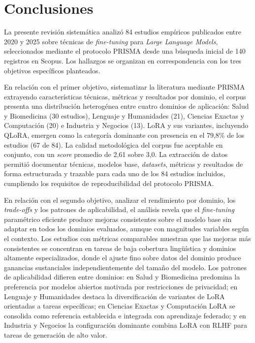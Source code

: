\chapter{Conclusiones}

La presente revisión sistemática analizó 84 estudios empíricos publicados entre 2020 y 2025 sobre técnicas de \textit{fine-tuning} para \textit{Large Language Models}, seleccionados mediante el protocolo PRISMA desde una búsqueda inicial de 140 registros en Scopus. Los hallazgos se organizan en correspondencia con los tres objetivos específicos planteados.

En relación con el primer objetivo, sistematizar la literatura mediante PRISMA extrayendo características técnicas, métricas y resultados por dominio, el corpus presenta una distribución heterogénea entre cuatro dominios de aplicación: Salud y Biomedicina (30 estudios), Lenguaje y Humanidades (21), Ciencias Exactas y Computación (20) e Industria y Negocios (13). LoRA y sus variantes, incluyendo QLoRA, emergen como la categoría dominante con presencia en el 79,8\% de los estudios (67 de 84). La calidad metodológica del corpus fue aceptable en conjunto, con un \textit{score} promedio de 2,61 sobre 3,0. La extracción de datos permitió documentar técnicas, modelos base, \textit{datasets}, métricas y resultados de forma estructurada y trazable para cada uno de los 84 estudios incluidos, cumpliendo los requisitos de reproducibilidad del protocolo PRISMA.

En relación con el segundo objetivo, analizar el rendimiento por dominio, los \textit{trade-offs} y los patrones de aplicabilidad, el análisis revela que el \textit{fine-tuning} paramétrico eficiente produce mejoras consistentes sobre el modelo base sin adaptar en todos los dominios evaluados, aunque con magnitudes variables según el contexto. Los estudios con métricas comparables muestran que las mejoras más consistentes se concentran en tareas de baja cobertura lingüística y dominios altamente especializados, donde el ajuste fino sobre datos del dominio produce ganancias sustanciales independientemente del tamaño del modelo. Los patrones de aplicabilidad difieren entre dominios: en Salud y Biomedicina predomina la preferencia por modelos abiertos motivada por restricciones de privacidad; en Lenguaje y Humanidades destaca la diversificación de variantes de LoRA orientadas a tareas específicas; en Ciencias Exactas y Computación LoRA se consolida como referencia establecida e integrada con aprendizaje federado; y en Industria y Negocios la configuración dominante combina LoRA con RLHF para tareas de generación de alto valor.

